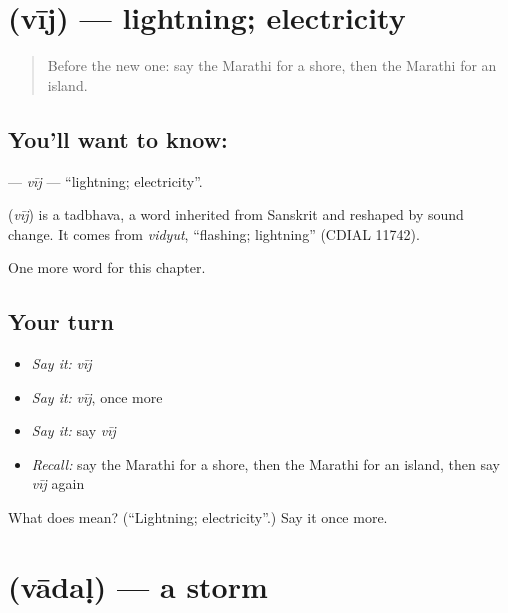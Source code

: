 \section[\texorpdfstring{\mr{वीज} (vīj)}{वीज (vīj)}]{ (vīj) — lightning; electricity}

\label{lesson:MR-C141-vij}



\begin{quote}
Before the new one: say the Marathi for a shore, then the Marathi for an island.
\end{quote}

\subsection*{You'll want to know: }
\textbf{} — \emph{vīj} — \textquotedblleft{}lightning; electricity\textquotedblright{}.

\begin{cousinweb}
\textbf{} (\emph{vīj}) is a tadbhava, a word inherited from Sanskrit and reshaped by sound change. It comes from \emph{vidyut}, \textquotedblleft{}flashing; lightning\textquotedblright{} (CDIAL 11742).
\end{cousinweb}

\begin{grammarlens}[title={What you've built}]
One more word for this chapter.
\end{grammarlens}

\subsection*{Your turn}
\begin{itemize}
\raggedright
  \item \emph{Say it:} \emph{vīj}
  \item \emph{Say it:} \emph{vīj}, once more
  \item \emph{Say it:} say \emph{vīj}
  \item \emph{Recall:} say the Marathi for a shore, then the Marathi for an island, then say \emph{vīj} again
\end{itemize}

\begin{tcolorbox}[breakable,colback=teal!4,colframe=teal!35!black,title={Before you move on}]
What does  mean? (\textquotedblleft{}Lightning; electricity\textquotedblright{}.) Say it once more.
\end{tcolorbox}
\section[\texorpdfstring{\mr{वादळ} (vādaḷ)}{वादळ (vādaḷ)}]{ (vādaḷ) — a storm}

